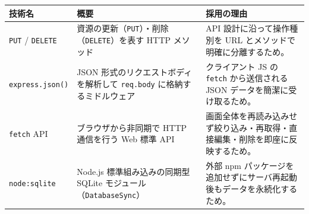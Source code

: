 \documentclass[
  a4paper,
  fontsize=11pt,
  line_length=40zw,
  number_of_lines=35,
  baselineskip=1.7zw
]{jlreq}
\begin{document}
\begin{table}[htbp]
  \centering
  \small
  \begin{tabularx}{\textwidth}{lXX}
    \toprule
    技術名 & 概要 & 採用の理由 \\
    \midrule
    \texttt{PUT} / \texttt{DELETE} &
      資源の更新（\texttt{PUT}）・削除（\texttt{DELETE}）を表す HTTP メソッド &
      API 設計に沿って操作種別を URL とメソッドで明確に分離するため。 \\
    \texttt{express.json()} &
      JSON 形式のリクエストボディを解析して \texttt{req.body} に格納するミドルウェア &
      クライアント JS の \texttt{fetch} から送信される JSON データを簡潔に受け取るため。 \\
    \texttt{fetch} API &
      ブラウザから非同期で HTTP 通信を行う Web 標準 API &
      画面全体を再読み込みせず絞り込み・再取得・直接編集・削除を即座に反映するため。 \\
    \texttt{node:sqlite} &
      Node.js 標準組み込みの同期型 SQLite モジュール（\texttt{DatabaseSync}） &
      外部 npm パッケージを追加せずにサーバ再起動後もデータを永続化するため。 \\
    \bottomrule
  \end{tabularx}
\end{table}
\end{document}
